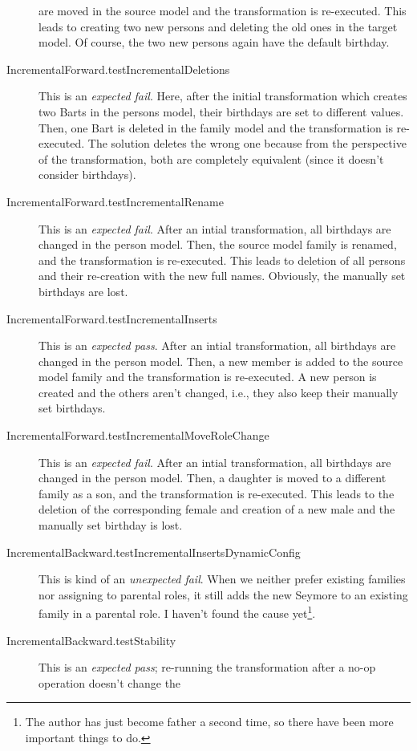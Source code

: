 \documentclass[a4paper]{article}
\begin{document}
\begin{description}
  are moved in the source model and the transformation is re-executed.  This
  leads to creating two new persons and deleting the old ones in the target
  model.  Of course, the two new persons again have the default birthday.
\item[IncrementalForward.testIncrementalDeletions] This is an \emph{expected
    fail}.  Here, after the initial transformation which creates two Barts in
  the persons model, their birthdays are set to different values.  Then, one
  Bart is deleted in the family model and the transformation is re-executed.
  The solution deletes the wrong one because from the perspective of the
  transformation, both are completely equivalent (since it doesn't consider
  birthdays).
\item[IncrementalForward.testIncrementalRename] This is an \emph{expected
    fail}.  After an intial transformation, all birthdays are changed in the
  person model.  Then, the source model family is renamed, and the
  transformation is re-executed.  This leads to deletion of all persons and
  their re-creation with the new full names.  Obviously, the manually set
  birthdays are lost.
\item[IncrementalForward.testIncrementalInserts] This is an \emph{expected
    pass}.  After an intial transformation, all birthdays are changed in the
  person model.  Then, a new member is added to the source model family and the
  transformation is re-executed.  A new person is created and the others aren't
  changed, i.e., they also keep their manually set birthdays.
\item[IncrementalForward.testIncrementalMoveRoleChange] This is an
  \emph{expected fail}.  After an intial transformation, all birthdays are
  changed in the person model.  Then, a daughter is moved to a different family
  as a son, and the transformation is re-executed.  This leads to the deletion
  of the corresponding female and creation of a new male and the manually set
  birthday is lost.
\item[IncrementalBackward.testIncrementalInsertsDynamicConfig] This is kind of
  an \emph{unexpected fail}.  When we neither prefer existing families nor
  assigning to parental roles, it still adds the new Seymore to an existing
  family in a parental role.  I haven't found the cause yet\footnote{The author
    has just become father a second time, so there have been more important
    things to do.}.
\item[IncrementalBackward.testStability] This is an \emph{expected pass};
  re-running the transformation after a no-op operation doesn't change the

\end{description}
\end{document}
